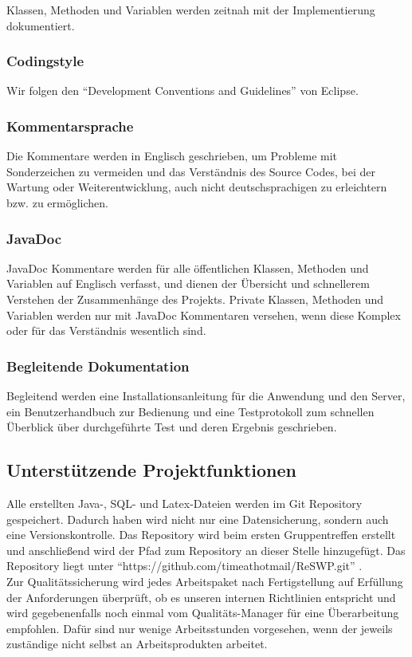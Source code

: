 Klassen, Methoden und Variablen werden zeitnah mit der Implementierung dokumentiert.

\subsubsection{Codingstyle}

Wir folgen den "`Development Conventions and Guidelines"' von Eclipse.

\subsubsection{Kommentarsprache}

Die Kommentare werden in Englisch geschrieben, um Probleme mit Sonderzeichen zu vermeiden und das Verständnis des Source Codes, bei der Wartung oder Weiterentwicklung, auch nicht deutschsprachigen zu erleichtern bzw. zu ermöglichen.

\subsubsection{JavaDoc}

JavaDoc Kommentare werden für alle öffentlichen Klassen, Methoden und Variablen auf Englisch verfasst, und dienen der Übersicht und schnellerem Verstehen der Zusammenhänge des Projekts.
Private Klassen, Methoden und Variablen werden nur mit JavaDoc Kommentaren versehen, wenn diese Komplex oder für das Verständnis wesentlich sind.

\subsubsection{Begleitende Dokumentation}

Begleitend werden eine Installationsanleitung für die Anwendung und den Server, ein Benutzerhandbuch zur Bedienung und eine Testprotokoll zum schnellen Überblick über durchgeführte Test und deren Ergebnis geschrieben.

\subsection{Unterstützende Projektfunktionen}

Alle erstellten Java-, SQL- und Latex-Dateien werden im Git Repository gespeichert. Dadurch haben wird nicht nur eine Datensicherung, sondern auch eine Versionskontrolle. Das Repository wird beim ersten Gruppentreffen erstellt und anschließend wird der Pfad zum Repository an dieser Stelle hinzugefügt. Das Repository liegt unter "`https://github.com/timeathotmail/ReSWP.git"' .\\
Zur Qualitätssicherung wird jedes Arbeitspaket nach Fertigstellung auf Erfüllung der Anforderungen überprüft, ob es unseren internen Richtlinien entspricht und wird gegebenenfalls noch einmal vom Qualitäts-Manager für eine Überarbeitung empfohlen. Dafür sind nur wenige Arbeitsstunden vorgesehen, wenn der jeweils zuständige nicht selbst an Arbeitsprodukten arbeitet.

